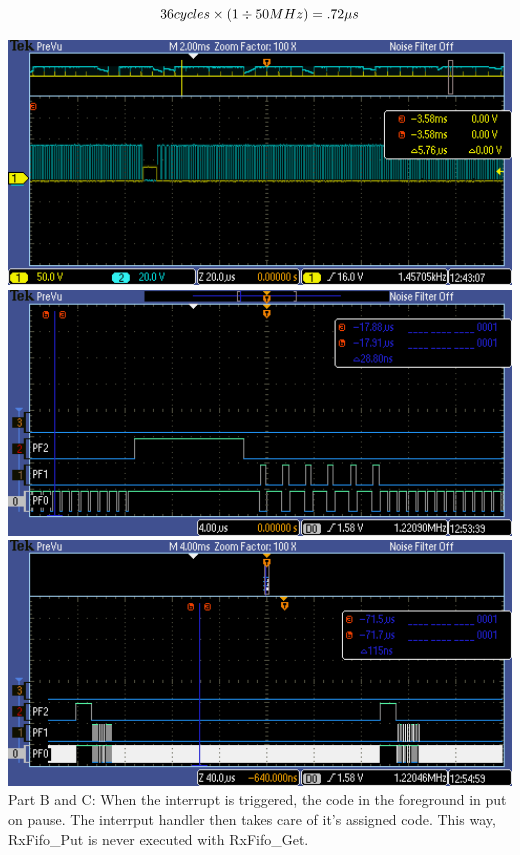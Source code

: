 \documentclass[11pt]{article}
\begin{document}
\begin{equation*}
36 cycles \times (1 \div 50 MHz) = .72 \mu s\\
\end{equation*}
\vskip 0.5in

  \includegraphics[width=1\textwidth]{TEK00001}\\[.25in]
  \includegraphics[width=1\textwidth]{TEK00003}\\[.25in]
  \includegraphics[width=1\textwidth]{TEK00004}\\[.25in]
  Part B and C: When the interrupt is triggered, the code in the foreground in put on pause. The interrput handler then takes care of it's assigned code. This way, RxFifo\_Put is never executed with RxFifo\_Get.\\
  
\end{document}
